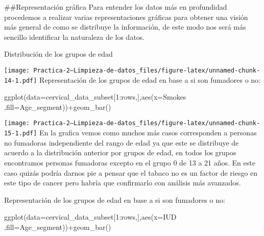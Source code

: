 \documentclass[
]{article}
\newenvironment{Shaded}{\begin{snugshade}}{\end{snugshade}}
\newcommand{\AttributeTok}[1]{\textcolor[rgb]{0.80,0.80,0.80}{#1}}
\newcommand{\DecValTok}[1]{\textcolor[rgb]{0.86,0.86,0.80}{#1}}
\newcommand{\FunctionTok}[1]{\textcolor[rgb]{0.94,0.94,0.56}{#1}}
\newcommand{\NormalTok}[1]{\textcolor[rgb]{0.80,0.80,0.80}{#1}}
\newcommand{\SpecialCharTok}[1]{\textcolor[rgb]{0.86,0.64,0.64}{#1}}
\begin{document}
\#\#Representación gráfica Para entender los datos más en profundidad
procedemos a realizar varias representaciones gráficas para obtener una
visión más general de como se distribuye la información, de este modo
nos será más sencillo identificar la naturaleza de los datos.

Distribución de los grupos de edad

\begin{Shaded}
\end{Shaded}

\texttt{[image: Practica-2---Limpieza-de-datos\_files/figure-latex/unnamed-chunk-14-1.pdf]}
Representación de los grupos de edad en base a si son fumadores o no:

\begin{Shaded}
\begin{Highlighting}[]
\FunctionTok{ggplot}\NormalTok{(}\AttributeTok{data=}\NormalTok{cervical\_data\_subset[}\DecValTok{1}\SpecialCharTok{:}\NormalTok{rows,],}\FunctionTok{aes}\NormalTok{(}\AttributeTok{x=}\NormalTok{Smokes ,}\AttributeTok{fill=}\NormalTok{Age\_segment))}\SpecialCharTok{+}\FunctionTok{geom\_bar}\NormalTok{()}
\end{Highlighting}
\end{Shaded}

\texttt{[image: Practica-2---Limpieza-de-datos\_files/figure-latex/unnamed-chunk-15-1.pdf]}
En la grafica vemos como muchos más casos corresponden a personas no
fumadoras independiente del rango de edad ya que este se distribuye de
acuerdo a la distribución anterior por grupos de edad, en todos los
grupos encontramos personas fumadoras excepto en el grupo 0 de 13 a 21
años. En este caso quizás podría darnos pie a pensar que el tabaco no es
un factor de riesgo en este tipo de cancer pero habría que confirmarlo
con análisis más avanzados.

Representación de los grupos de edad en base a si son fumadores o no:

\begin{Shaded}
\begin{Highlighting}[]
\FunctionTok{ggplot}\NormalTok{(}\AttributeTok{data=}\NormalTok{cervical\_data\_subset[}\DecValTok{1}\SpecialCharTok{:}\NormalTok{rows,],}\FunctionTok{aes}\NormalTok{(}\AttributeTok{x=}\NormalTok{IUD ,}\AttributeTok{fill=}\NormalTok{Age\_segment))}\SpecialCharTok{+}\FunctionTok{geom\_bar}\NormalTok{()}
\end{Highlighting}
\end{Shaded}
\end{document}

